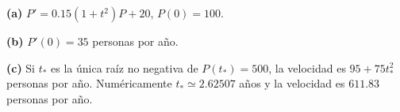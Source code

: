 \noindent\textbf{(a)} $P'=0.15(1+t^2)P+20$, $P(0)=100$.

\noindent\textbf{(b)} $P'(0)=35$ personas por año.

\noindent\textbf{(c)} Si $t_*$ es la única raíz no negativa de $P(t_*)=500$, la velocidad es $95+75t_*^2$ personas por año. Numéricamente $t_*\simeq2.62507$ años y la velocidad es $611.83$ personas por año.
